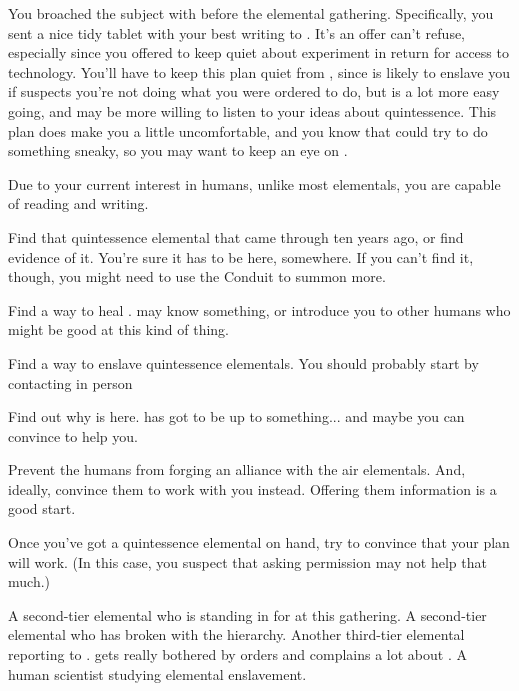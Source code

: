 \documentclass[char]{elementals}
\begin{document}
You broached the subject with \cMS{} before the elemental gathering.  Specifically, you sent a nice tidy tablet with your best writing to \cMS{\them}.  It's an offer \cMS{} can't refuse, especially since you offered to keep quiet about \cMS{\their} experiment in return for access to \cMS{\their} technology.  You'll have to keep this plan quiet from \cLoyal{}, since \cLoyal{\they} is likely to enslave you if \cLoyal{\they} suspects you're not doing what you were ordered to do, but \cRogue{} is a lot more easy going, and may be more willing to listen to your ideas about quintessence.  This plan does make you a little uncomfortable, and you know that \cMS{} could try to do something sneaky, so you may want to keep an eye on \cMS{\them}.

Due to your current interest in humans, unlike most elementals, you are capable of reading and writing.

\begin{itemz}[Goals]
	\item Find that quintessence elemental that came through ten years ago, or find evidence of it.  You're sure it has to be here, somewhere. If you can't find it, though, you might need to use the Conduit to summon more.
	\item Find a way to heal \cEarthKing{}.  \cMS{} may know something, or introduce you to other humans who might be good at this kind of thing.
	\item Find a way to enslave quintessence elementals.  You should probably start by contacting \cMS{} in person
	\item Find out why \cRogue{} is here.  \cRogue{\They} has got to be up to something... and maybe you can convince \cRogue{\them} to help you.
	\item Prevent the humans from forging an alliance with the air elementals.  And, ideally, convince them to work with you instead.  Offering them information is a good start.
	\item Once you've got a quintessence elemental on hand, try to convince \cLoyal{} that your plan will work.  (In this case, you suspect that asking permission may not help that much.)
\end{itemz}

\begin{contacts}
	\contact{\cLoyal{}}  A second-tier elemental who is standing in for \cEarthKing{} at this gathering.
	\contact{\cRogue{}}  A second-tier elemental who has broken with the hierarchy.
  \contact{\cMiniEarth{}}  Another third-tier elemental reporting to \cLoyal{}.  \cMiniEarth{\They} gets really bothered by orders and complains a lot about \cLoyal{}.
	\contact{\cMS{}}  A human scientist studying elemental enslavement.
\end{contacts}
\end{document}
